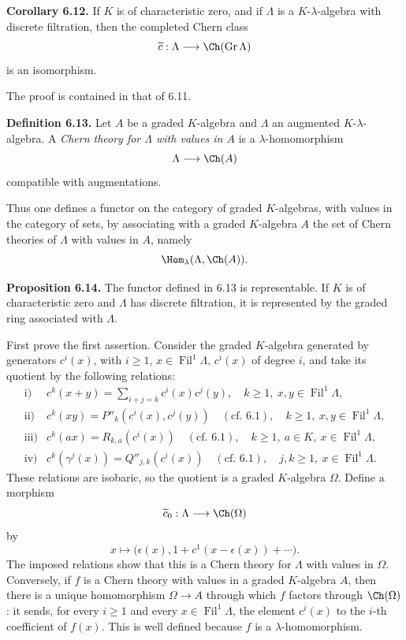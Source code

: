 \documentclass[11pt]{article}
\newcommand{\Gr}{\operatorname{Gr}}
\newcommand{\Fil}{\operatorname{Fil}}
\providecommand{\Gr}{\operatorname{Gr}}
\providecommand{\Gr}{\operatorname{G}}
\begin{document}
\textbf{Corollary 6.12.} If \(K\) is of characteristic zero, and if \(\Lambda\) is a \(K\)-\(\lambda\)-algebra with discrete filtration, then the completed Chern class
\[
  \widetilde c:\Lambda\longrightarrow \Ch(\Gr\Lambda)
\]
is an isomorphism.

The proof is contained in that of 6.11.

\textbf{Definition 6.13.} Let \(A\) be a graded \(K\)-algebra and \(\Lambda\) an augmented \(K\)-\(\lambda\)-algebra. A \emph{Chern theory for \(\Lambda\) with values in \(A\)} is a \(\lambda\)-homomorphism
\[
  \Lambda\longrightarrow \Ch(A)
\]
compatible with augmentations.

Thus one defines a functor on the category of graded \(K\)-algebras, with values in the category of sets, by associating with a graded \(K\)-algebra \(A\) the set of Chern theories of \(\Lambda\) with values in \(A\), namely
\[
  \Hom_\lambda(\Lambda,\Ch(A)).
\]

\textbf{Proposition 6.14.} The functor defined in 6.13 is representable. If \(K\) is of characteristic zero and \(\Lambda\) has discrete filtration, it is represented by the graded ring associated with \(\Lambda\).

First prove the first assertion. Consider the graded \(K\)-algebra generated by generators \(c^i(x)\), with \(i\ge1\), \(x\in\Fil^1\Lambda\), \(c^i(x)\) of degree \(i\), and take its quotient by the following relations:
\[
\begin{array}{ll}
\text{i)}&
 c^k(x+y)=\displaystyle\sum_{i+j=k}c^i(x)c^j(y),
 \quad k\ge1,\ x,y\in\Fil^1\Lambda,\\[0.8em]
\text{ii)}&
 c^k(xy)=P''_k(c^i(x),c^j(y))
 \quad(\text{cf. }6.1),
 \quad k\ge1,\ x,y\in\Fil^1\Lambda,\\[0.4em]
\text{iii)}&
 c^k(ax)=R_{k,a}(c^i(x))
 \quad(\text{cf. }6.1),
 \quad k\ge1,\ a\in K,\ x\in\Fil^1\Lambda,\\[0.4em]
\text{iv)}&
 c^k(\gamma^j(x))=Q''_{j,k}(c^i(x))
 \quad(\text{cf. }6.1),
 \quad j,k\ge1,\ x\in\Fil^1\Lambda.
\end{array}
\]
These relations are isobaric, so the quotient is a graded \(K\)-algebra \(\Omega\). Define a morphism
\[
  \widetilde c_0:\Lambda\longrightarrow \Ch(\Omega)
\]
by
\[
  x\longmapsto
  \bigl(\epsilon(x),1+c^1(x-\epsilon(x))+\cdots\bigr).
\]
The imposed relations show that this is a Chern theory for \(\Lambda\) with values in \(\Omega\). Conversely, if \(f\) is a Chern theory with values in a graded \(K\)-algebra \(A\), then there is a unique homomorphism \(\Omega\to A\) through which \(f\) factors through \(\Ch(\Omega)\): it sends, for every \(i\ge1\) and every \(x\in\Fil^1\Lambda\), the element \(c^i(x)\) to the \(i\)-th coefficient of \(f(x)\). This is well defined because \(f\) is a \(\lambda\)-homomorphism.
\end{document}

